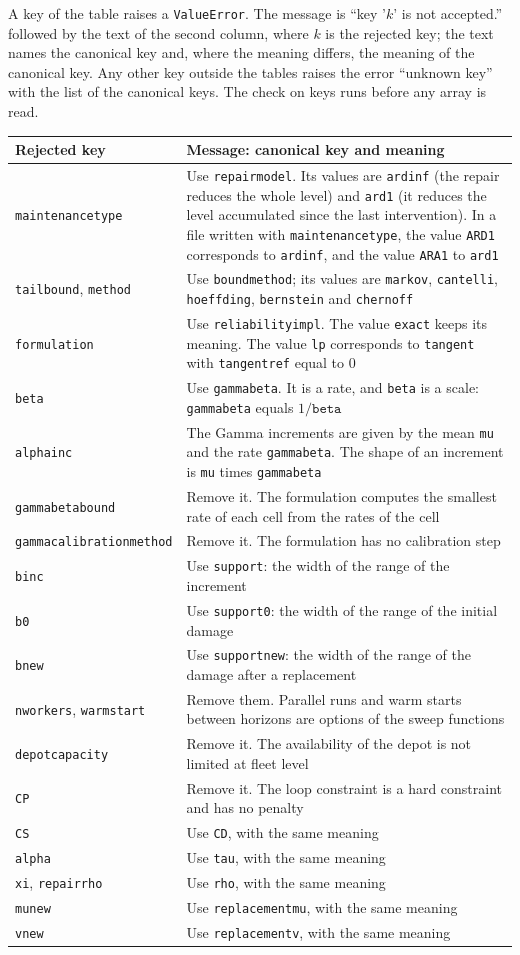 \documentclass[11pt,a4paper]{article}
\makeatletter
\theoremstyle{plain}
\theoremstyle{definition}
\renewcommand{\_}{\textunderscore\allowbreak{}}
\providecommand{\rejrow}[2]{{\raggedright #1\par} & {\raggedright #2\par} \\}
\providecommand{\tabstart}[2]{\begingroup\small\begin{longtable}{@{}#1@{}}\toprule #2 \\ \midrule \endhead}
\providecommand{\tabend}{\bottomrule\end{longtable}\endgroup}
\makeatother
\begin{document}
A key of the table raises a \texttt{ValueError}.
The message is ``key '$k$' is not accepted.'' followed by the text of the second column, where $k$ is the rejected key; the text names the canonical key and, where the meaning differs, the meaning of the canonical key.
Any other key outside the tables raises the error ``unknown key'' with the list of the canonical keys.
The check on keys runs before any array is read.

\tabstart{p{3.3cm}p{11.0cm}}{Rejected key & Message: canonical key and meaning}
\rejrow{\texttt{maintenance\_type}}{Use \texttt{repair\_model}. Its values are \texttt{ardinf} (the repair reduces the whole level) and \texttt{ard1} (it reduces the level accumulated since the last intervention). In a file written with \texttt{maintenance\_type}, the value \texttt{ARD1} corresponds to \texttt{ardinf}, and the value \texttt{ARA1} to \texttt{ard1}}
\rejrow{\texttt{tail\_bound}, \texttt{method}}{Use \texttt{bound\_method}; its values are \texttt{markov}, \texttt{cantelli}, \texttt{hoeffding}, \texttt{bernstein} and \texttt{chernoff}}
\rejrow{\texttt{formulation}}{Use \texttt{reliability\_impl}. The value \texttt{exact} keeps its meaning. The value \texttt{lp} corresponds to \texttt{tangent} with \texttt{tangent\_ref} equal to $0$}
\rejrow{\texttt{beta}}{Use \texttt{gamma\_beta}. It is a rate, and \texttt{beta} is a scale: \texttt{gamma\_beta} equals $1/\texttt{beta}$}
\rejrow{\texttt{alpha\_inc}}{The Gamma increments are given by the mean \texttt{mu} and the rate \texttt{gamma\_beta}. The shape of an increment is \texttt{mu} times \texttt{gamma\_beta}}
\rejrow{\texttt{gamma\_beta\_bound}}{Remove it. The formulation computes the smallest rate of each cell from the rates of the cell}
\rejrow{\texttt{gamma\_calibration\_method}}{Remove it. The formulation has no calibration step}
\rejrow{\texttt{b\_inc}}{Use \texttt{support}: the width of the range of the increment}
\rejrow{\texttt{b\_0}}{Use \texttt{support\_0}: the width of the range of the initial damage}
\rejrow{\texttt{b\_new}}{Use \texttt{support\_new}: the width of the range of the damage after a replacement}
\rejrow{\texttt{n\_workers}, \texttt{warm\_start}}{Remove them. Parallel runs and warm starts between horizons are options of the sweep functions}
\rejrow{\texttt{depot\_capacity}}{Remove it. The availability of the depot is not limited at fleet level}
\rejrow{\texttt{C\_P}}{Remove it. The loop constraint is a hard constraint and has no penalty}
\rejrow{\texttt{C\_S}}{Use \texttt{C\_D}, with the same meaning}
\rejrow{\texttt{alpha}}{Use \texttt{tau}, with the same meaning}
\rejrow{\texttt{xi}, \texttt{repair\_rho}}{Use \texttt{rho}, with the same meaning}
\rejrow{\texttt{mu\_new}}{Use \texttt{replacement\_mu}, with the same meaning}
\rejrow{\texttt{v\_new}}{Use \texttt{replacement\_v}, with the same meaning}
\tabend
\end{document}
